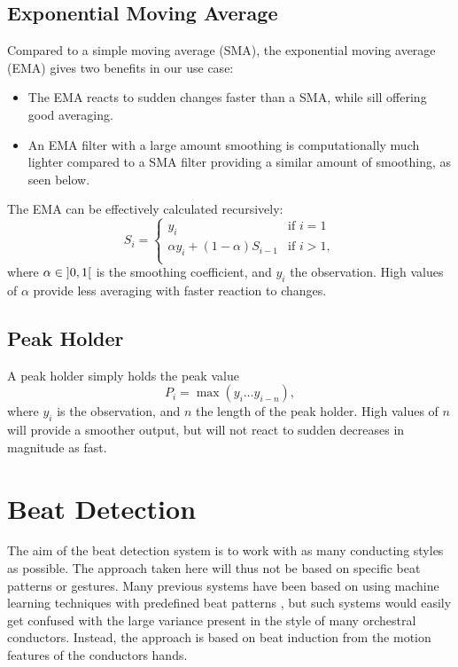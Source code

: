 \subsection{Exponential Moving Average}

Compared to a simple moving average (SMA),
the exponential moving average (EMA)
gives two benefits in our use case:
\begin{itemize}
\item The EMA reacts to sudden changes faster than a SMA,
while sill offering good averaging.
\item An EMA filter with a large amount smoothing is computationally much
lighter compared to a SMA filter providing a similar amount of smoothing,
as seen below.
\end{itemize}
The EMA can be effectively calculated recursively:
\begin{equation}
S_i =
\begin{cases}
y_i & \text{if } i = 1 \\
\alpha y_i + ( 1 - \alpha ) S_{i-1} & \text{if } i > 1, \\
\end{cases}
\end{equation}
where $\alpha \in \mathopen] 0, 1 \mathclose[$ is the smoothing coefficient,
and $y_i$ the \nth[i] observation.
High values of $\alpha$
provide less averaging with faster reaction to changes.

\subsection{Peak Holder}

A peak holder simply holds the peak value
\begin{equation}
P_i = \max \left( y_i \ldots y_{i - n} \right),
\end{equation}
where $y_i$ is the \nth[i] observation,
and $n$ the length of the peak holder.
High values of $n$ will provide a smoother output,
but will not react to sudden decreases in magnitude as fast.

\section{Beat Detection}
\label{sec:beat_detection}

The aim of the beat detection system is
to work with as many conducting styles as possible.
The approach taken here will thus not be
based on specific beat patterns or gestures.
Many previous systems have been based on
using machine learning techniques with
predefined beat patterns \cite{getsomecites},
but such systems would easily get confused with
the large variance present in the style of
many orchestral conductors.
Instead, the approach is based on beat induction
from the motion features of the conductors hands.

